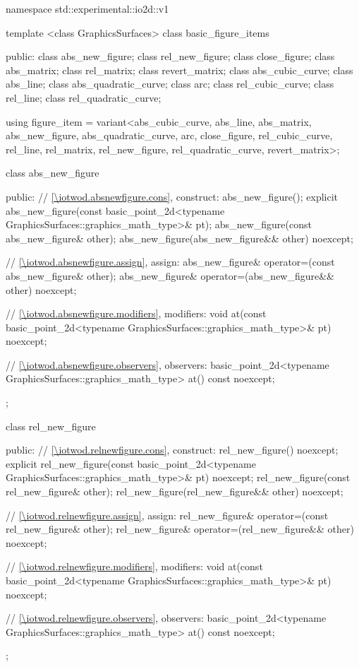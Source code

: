 \begin{codeblock}
namespace std::experimental::io2d::v1 {
  template <class GraphicsSurfaces>
  class basic_figure_items {
  public:
    class abs_new_figure;
    class rel_new_figure;
    class close_figure;
    class abs_matrix;
    class rel_matrix;
    class revert_matrix;
    class abs_cubic_curve;
    class abs_line;
    class abs_quadratic_curve;
    class arc;
    class rel_cubic_curve;
    class rel_line;
    class rel_quadratic_curve;

    using figure_item = variant<abs_cubic_curve, abs_line, abs_matrix,
      abs_new_figure, abs_quadratic_curve, arc, close_figure, rel_cubic_curve, 
      rel_line, rel_matrix, rel_new_figure, rel_quadratic_curve, revert_matrix>;

    class abs_new_figure {
    public:
      // \ref{\iotwod.absnewfigure.cons}, construct:
      abs_new_figure();
      explicit abs_new_figure(const basic_point_2d<typename
      GraphicsSurfaces::graphics_math_type>& pt);
      abs_new_figure(const abs_new_figure& other);
      abs_new_figure(abs_new_figure&& other) noexcept;

      // \ref{\iotwod.absnewfigure.assign}, assign:
      abs_new_figure& operator=(const abs_new_figure& other);
      abs_new_figure& operator=(abs_new_figure&& other) noexcept;

      // \ref{\iotwod.absnewfigure.modifiers}, modifiers:
      void at(const basic_point_2d<typename GraphicsSurfaces::graphics_math_type>& pt) noexcept;

      // \ref{\iotwod.absnewfigure.observers}, observers:
      basic_point_2d<typename GraphicsSurfaces::graphics_math_type> at() const noexcept;
    };

    class rel_new_figure {
    public:
      // \ref{\iotwod.relnewfigure.cons}, construct:
      rel_new_figure() noexcept;
      explicit rel_new_figure(const basic_point_2d<typename
        GraphicsSurfaces::graphics_math_type>& pt) noexcept;
      rel_new_figure(const rel_new_figure& other);
      rel_new_figure(rel_new_figure&& other) noexcept;

      // \ref{\iotwod.relnewfigure.assign}, assign:
      rel_new_figure& operator=(const rel_new_figure& other);
      rel_new_figure& operator=(rel_new_figure&& other) noexcept;

      // \ref{\iotwod.relnewfigure.modifiers}, modifiers:
      void at(const basic_point_2d<typename GraphicsSurfaces::graphics_math_type>& pt) noexcept;

      // \ref{\iotwod.relnewfigure.observers}, observers:
      basic_point_2d<typename GraphicsSurfaces::graphics_math_type> at() const noexcept;
    };

}}
\end{codeblock}

